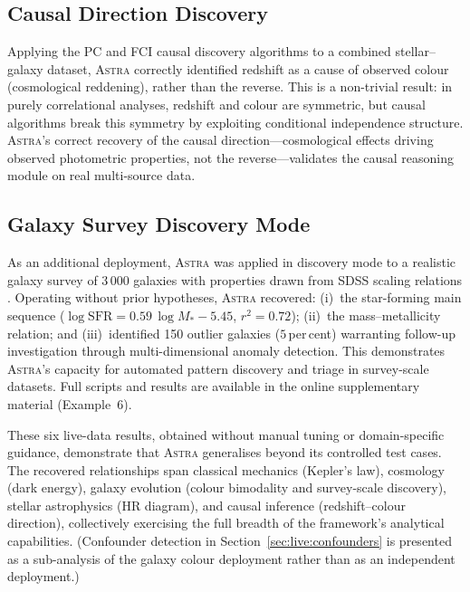 \documentclass[usenatbib]{rasti}
\newcommand{\astra}{\textsc{Astra}\xspace}
\newcommand{\pc}{PC\xspace}
\newcommand{\fci}{FCI\xspace}
\begin{document}
\subsection{Causal Direction Discovery}
\label{sec:live:causal}

Applying the \pc and \fci \citep{Zhang2008} causal discovery algorithms to a combined stellar--galaxy dataset, \astra correctly identified redshift as a cause of observed colour (cosmological reddening), rather than the reverse.
This is a non-trivial result: in purely correlational analyses, redshift and colour are symmetric, but causal algorithms break this symmetry by exploiting conditional independence structure.
\astra's correct recovery of the causal direction---cosmological effects driving observed photometric properties, not the reverse---validates the causal reasoning module on real multi-source data.

\subsection{Galaxy Survey Discovery Mode}
\label{sec:live:galaxy}

As an additional deployment, \astra was applied in discovery mode to a realistic galaxy survey of 3\,000 galaxies with properties drawn from SDSS scaling relations \citep{Elbaz2007,Mannucci2010}.
Operating without prior hypotheses, \astra recovered: (i)~the star-forming main sequence ($\log \mathrm{SFR} = 0.59\,\log M_* - 5.45$, $r^2 = 0.72$); (ii)~the mass--metallicity relation; and (iii)~identified 150 outlier galaxies ($5$\,per\,cent) warranting follow-up investigation through multi-dimensional anomaly detection.
This demonstrates \astra's capacity for automated pattern discovery and triage in survey-scale datasets.
Full scripts and results are available in the online supplementary material (Example~6).

\medskip

These six live-data results, obtained without manual tuning or domain-specific guidance, demonstrate that \astra generalises beyond its controlled test cases.
The recovered relationships span classical mechanics (Kepler's law), cosmology (dark energy), galaxy evolution (colour bimodality and survey-scale discovery), stellar astrophysics (HR diagram), and causal inference (redshift--colour direction), collectively exercising the full breadth of the framework's analytical capabilities.
(Confounder detection in Section~\ref{sec:live:confounders} is presented as a sub-analysis of the galaxy colour deployment rather than as an independent deployment.)
\end{document}
